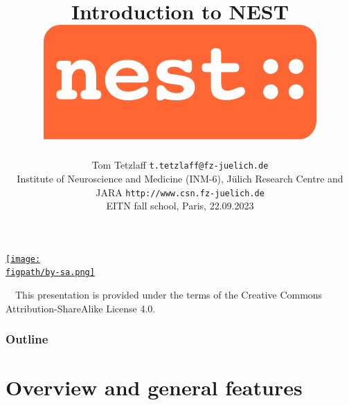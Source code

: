 \documentclass[8pt,t,usepdftitle=false]{beamer}
\title{%
  {\LARGE\bf Introduction to NEST}
  \hfill\includegraphics[width=0.15\linewidth]{./figures/nest-logo}\\[1ex]
}
\subtitle{%
  {\normalsize\mdseries Tom Tetzlaff}%
  {\hfill\tiny\texttt{t.tetzlaff@fz-juelich.de}}\\  
  {\footnotesize\mdseries Institute of Neuroscience and Medicine (INM-6), J\"ulich Research Centre and JARA}
  {\hfill\tiny\texttt{http://www.csn.fz-juelich.de}}
  \\
  {\tiny\mdseries EITN fall school, Paris, 22.09.2023}
}
\date{}
\author{}
\institute{}
\def\figpath{./figures}
\begin{document}
\maketitle

\begin{frame}[plain]
  \begin{center}
    \parbox{0.9\linewidth}{
      \vspace{0.95\textheight}
      \parbox[c]{0.1\linewidth}{%
        \href{https://creativecommons.org/licenses/by-sa/4.0}{%
          \texttt{[image: \\figpath/by-sa.png]}}}
      \parbox[c]{0.9\linewidth}{\scriptsize%
        ~~{}This presentation is provided under the terms of the Creative Commons Attribution-ShareAlike License 4.0.
      }
    }    
  \end{center}
\end{frame}
\def\ttl{Outline}
\begin{frame}[plain]
  \frametitle{\ttl}
  \tableofcontents
\end{frame}
\def\ttl{Overview and general features}\section{\ttl}
\end{document}
